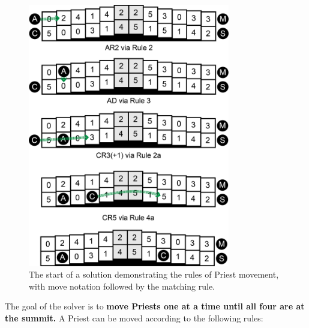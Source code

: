 \documentclass[journal]{IEEEtran}
\begin{document}
\begin{figure}[t]
\centering
\includegraphics[width=8.8cm]{priestrulesfixed.png}
\caption{The start of a solution demonstrating the rules of Priest movement, with move notation followed by the matching rule. }
\label{fig:priestrules}
\end{figure}


The goal of the solver is to {\bf move Priests one at a time until all four are at the summit.} A Priest can be moved according to the following rules:  
\end{document}
